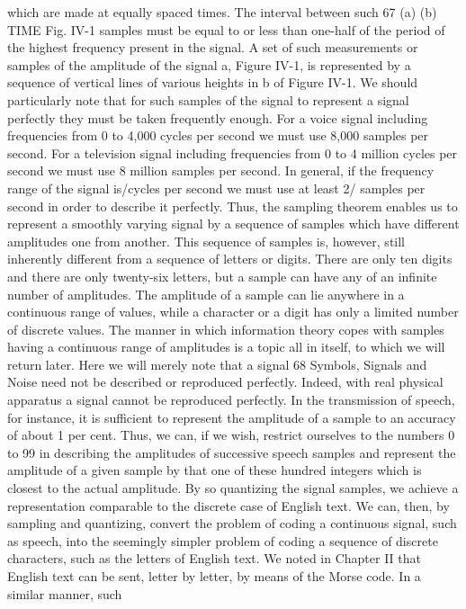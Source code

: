 which are made at equally spaced times. The interval between such
67
(a)
(b)
TIME
Fig. IV-1
samples must be equal to or less than one-half of the period of the
highest frequency present in the signal. A set of such measurements
or samples of the amplitude of the signal a, Figure IV-1, is represented
by a sequence of vertical lines of various heights in b of
Figure IV-1.
We should particularly note that for such samples of the signal
to represent a signal perfectly they must be taken frequently
enough. For a voice signal including frequencies from 0 to 4,000
cycles per second we must use 8,000 samples per second. For a
television signal including frequencies from 0 to 4 million cycles
per second we must use 8 million samples per second. In general,
if the frequency range of the signal is/cycles per second we must
use at least 2/ samples per second in order to describe it perfectly.
Thus, the sampling theorem enables us to represent a smoothly
varying signal by a sequence of samples which have different
amplitudes one from another. This sequence of samples is, however,
still inherently different from a sequence of letters or digits.
There are only ten digits and there are only twenty-six letters, but
a sample can have any of an infinite number of amplitudes. The
amplitude of a sample can lie anywhere in a continuous range of
values, while a character or a digit has only a limited number of
discrete values.
The manner in which information theory copes with samples
having a continuous range of amplitudes is a topic all in itself, to
which we will return later. Here we will merely note that a signal
68
Symbols, Signals and Noise
need not be described or reproduced perfectly. Indeed, with real
physical apparatus a signal cannot be reproduced perfectly. In the
transmission of speech, for instance, it is sufficient to represent the
amplitude of a sample to an accuracy of about 1 per cent. Thus,
we can, if we wish, restrict ourselves to the numbers 0 to 99 in
describing the amplitudes of successive speech samples and represent
the amplitude of a given sample by that one of these hundred
integers which is closest to the actual amplitude. By so quantizing
the signal samples, we achieve a representation comparable to the
discrete case of English text.
We can, then, by sampling and quantizing, convert the problem
of coding a continuous signal, such as speech, into the seemingly
simpler problem of coding a sequence of discrete characters, such
as the letters of English text.
We noted in Chapter II that English text can be sent, letter by
letter, by means of the Morse code. In a similar manner, such
